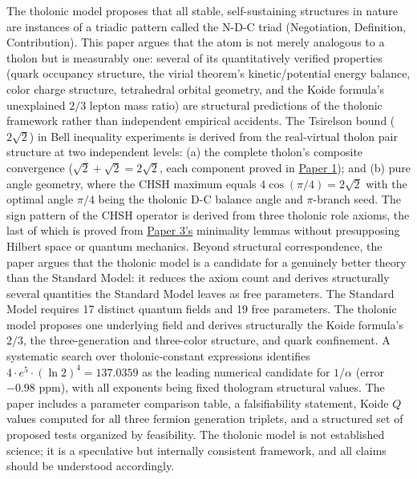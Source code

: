 \documentclass[
  11pt,
  letterpaper,
]{article}
\begin{document}
The tholonic model proposes that all stable, self-sustaining structures
in nature are instances of a triadic pattern called the N-D-C triad
(Negotiation, Definition, Contribution). This paper argues that the atom
is not merely analogous to a tholon but is measurably one: several of
its quantitatively verified properties (quark occupancy structure, the
virial theorem's kinetic/potential energy balance, color charge
structure, tetrahedral orbital geometry, and the Koide formula's
unexplained \(2/3\) lepton mass ratio) are structural predictions of the
tholonic framework rather than independent empirical accidents. The
Tsirelson bound (\(2\sqrt{2}\)) in Bell inequality experiments is
derived from the real-virtual tholon pair structure at two independent
levels: (a) the complete tholon's composite convergence
(\(\sqrt{2} + \sqrt{2} = 2\sqrt{2}\), each component proved in
\href{https://github.com/baardev/truevalue/blob/main/docnav/Research/papers/1_recursive-tholonic-five-constants/1_recursive-tholonic-five-constants.pdf}{Paper
1}); and (b) pure angle geometry, where the CHSH maximum equals
\(4\cos(\pi/4) = 2\sqrt{2}\) with the optimal angle \(\pi/4\) being the
tholonic D-C balance angle and \(\pi\)-branch seed. The sign pattern of
the CHSH operator is derived from three tholonic role axioms, the last
of which is proved from
\href{https://github.com/baardev/truevalue/blob/main/docnav/Research/papers/3_minimal-recursive-triadic-framework/3_minimal-recursive-triadic-framework.pdf}{Paper
3's} minimality lemmas without presupposing Hilbert space or quantum
mechanics. Beyond structural correspondence, the paper argues that the
tholonic model is a candidate for a genuinely better theory than the
Standard Model: it reduces the axiom count and derives structurally
several quantities the Standard Model leaves as free parameters. The
Standard Model requires 17 distinct quantum fields and 19 free
parameters. The tholonic model proposes one underlying field and derives
structurally the Koide formula's \(2/3\), the three-generation and
three-color structure, and quark confinement. A systematic search over
tholonic-constant expressions identifies
\(4 \cdot e^5 \cdot (\ln 2)^4 = 137.0359\) as the leading numerical
candidate for \(1/\alpha\) (error \(-0.98\) ppm), with all exponents
being fixed thologram structural values. The paper includes a parameter
comparison table, a falsifiability statement, Koide \(Q\) values
computed for all three fermion generation triplets, and a structured set
of proposed tests organized by feasibility. The tholonic model is not
established science; it is a speculative but internally consistent
framework, and all claims should be understood accordingly.
\end{document}
